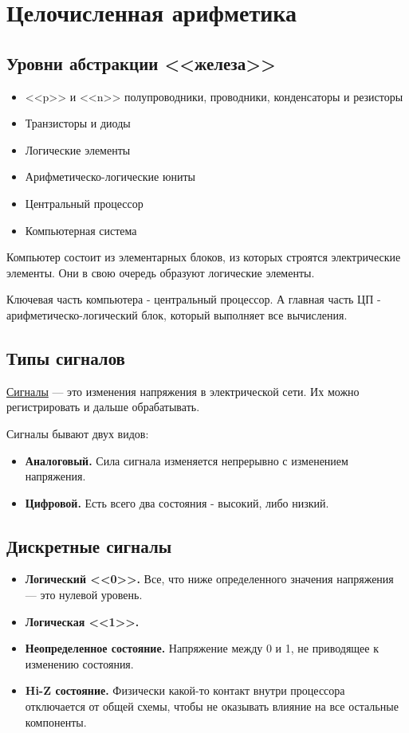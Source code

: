 \section{Целочисленная арифметика}

\subsection{Уровни абстракции <<железа>>}
\begin{itemize}
    \item <<p>> и <<n>> полупроводники, проводники, конденсаторы и резисторы
    \item Транзисторы и диоды
    \item Логические элементы
    \item Арифметическо-логические юниты
    \item Центральный процессор
    \item Компьютерная система
\end{itemize}

Компьютер состоит из элементарных блоков, из которых строятся электрические
элементы. Они в свою очередь образуют логические элементы.

Ключевая часть компьютера - центральный процессор. А главная часть ЦП - арифметическо-логический блок, который выполняет все вычисления.

\subsection{Типы сигналов}

\begin{Def}
    \underline{Сигналы} --- это изменения напряжения в электрической сети. Их можно регистрировать
и дальше обрабатывать.
\end{Def}

Сигналы бывают двух видов:
\begin{itemize}
    \item \textbf{Аналоговый.} Сила сигнала изменяется непрерывно с изменением напряжения.
    \item \textbf{Цифровой.} Есть всего два состояния - высокий, либо низкий.
\end{itemize}


\subsection{Дискретные сигналы}

\begin{itemize}
    \item \textbf{Логический <<0>>.} Все, что ниже определенного значения
        напряжения --- это нулевой уровень.
    \item \textbf{Логическая <<1>>.}
    \item \textbf{Неопределенное состояние.} Напряжение между 0 и 1, не приводящее к изменению состояния.
    \item \textbf{Hi-Z состояние.} Физически какой-то контакт внутри процессора отключается от общей схемы, чтобы не оказывать влияние на все остальные компоненты.
\end{itemize}

